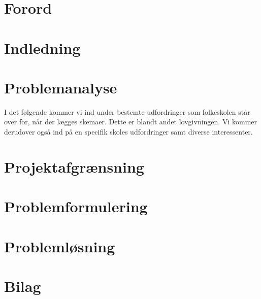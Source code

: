 \documentclass[12pt,hidelinks]{article}
\begin{document}
	\sloppy

	

	\newpage
	\section*{Forord}
	
	\newpage
	\tableofcontents
	\newpage
	\section{Indledning}
	
	\section{Problemanalyse}
	I det følgende kommer vi ind under bestemte udfordringer som folkeskolen står over for, når der lægges skemaer. Dette er blandt andet lovgivningen. Vi kommer derudover også ind på en specifik skoles udfordringer samt diverse interessenter.
	
	
	
	
	
	
	
	
	
	\section{Projektafgrænsning}
	
    \section{Problemformulering}
    
    \newpage
    \section{Problemløsning}
    
    \newpage
    
	
	

    \section{Bilag}
    
    
    
    \newpage
    
\end{document}
